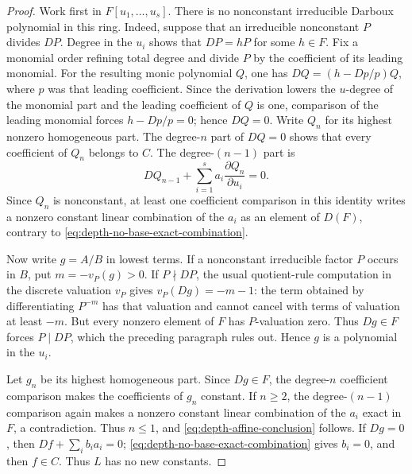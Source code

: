 \documentclass[11pt]{article}
\theoremstyle{definition}
\theoremstyle{remark}
\begin{document}
\begin{proof}
Work first in \(F[u_1,\ldots,u_s]\).  There is no nonconstant
irreducible Darboux polynomial in this ring.  Indeed, suppose that an
irreducible nonconstant \(P\) divides \(DP\).  Degree in the \(u_i\)
shows that \(DP=hP\) for some \(h\in F\).  Fix a monomial order refining
total degree and divide \(P\) by the coefficient of its leading monomial.
For the resulting monic polynomial \(Q\), one has
\(DQ=(h-Dp/p)Q\), where \(p\) was that leading coefficient.  Since the
derivation lowers the \(u\)-degree of the monomial part and the leading
coefficient of \(Q\) is one, comparison of the leading monomial forces
\(h-Dp/p=0\); hence \(DQ=0\).
Write \(Q_n\) for its highest nonzero homogeneous part.  The degree-\(n\)
part of \(DQ=0\) shows that every coefficient of \(Q_n\) belongs to \(C\).
The degree-\((n-1)\) part is
\[
 DQ_{n-1}+\sum_{i=1}^s
 a_i\frac{\partial Q_n}{\partial u_i}=0.
\]
Since \(Q_n\) is nonconstant, at least one coefficient comparison in this
identity writes a nonzero constant linear combination of the \(a_i\) as
an element of \(D(F)\), contrary to
\eqref{eq:depth-no-base-exact-combination}.

Now write \(g=A/B\) in lowest terms.  If a nonconstant irreducible factor
\(P\) occurs in \(B\), put \(m=-v_P(g)>0\).  If \(P\nmid DP\), the usual
quotient-rule computation in the discrete valuation \(v_P\) gives
\(v_P(Dg)=-m-1\): the term obtained by differentiating \(P^{-m}\) has
that valuation and cannot cancel with terms of valuation at least \(-m\).
But every nonzero element of \(F\) has \(P\)-valuation zero.  Thus
\(Dg\in F\) forces \(P\mid DP\), which the preceding paragraph rules out.
Hence \(g\) is a polynomial in the \(u_i\).

Let \(g_n\) be its highest homogeneous part.  Since \(Dg\in F\), the
degree-\(n\) coefficient comparison makes the coefficients of \(g_n\)
constant.  If \(n\geq2\), the degree-\((n-1)\) comparison again makes a
nonzero constant linear combination of the \(a_i\) exact in \(F\), a
contradiction.  Thus \(n\leq1\), and
\eqref{eq:depth-affine-conclusion} follows.  If \(Dg=0\), then
\(Df+\sum_i b_i a_i=0\);
\eqref{eq:depth-no-base-exact-combination} gives \(b_i=0\), and then
\(f\in C\).  Thus \(L\) has no new constants.
\end{proof}
\end{document}
